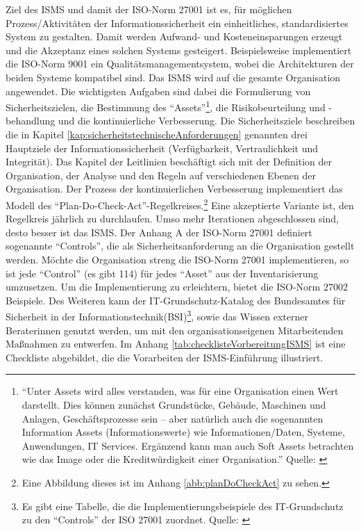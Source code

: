 Ziel des \ac{ISMS} und damit der ISO-Norm 27001 ist es, für möglichen Prozess/Aktivitäten der Informationssicherheit ein einheitliches, standardisiertes System zu gestalten. Damit werden Aufwand- und Kosteneinsparungen erzeugt und die Akzeptanz eines solchen Systems gesteigert. Beispielsweise implementiert die ISO-Norm 9001 ein Qualitätsmanagementsystem\autocite{dindeutsches_institut_fur_normung_qualitatsmanagementsysteme_2020}, wobei die Architekturen der beiden Systeme kompatibel sind. Das \ac{ISMS} wird auf die gesamte Organisation angewendet. Die wichtigsten Aufgaben sind dabei die Formulierung von Sicherheitszielen, die Bestimmung des \enquote{Assets}\footnote{\enquote{Unter Assets wird alles verstanden, was für eine Organisation einen Wert darstellt. Dies können zunächst Grundstücke, Gebäude, Maschinen und Anlagen, Geschäftsprozesse sein – aber natürlich auch die sogenannten Information Assets (Informationswerte) wie Informationen/Daten, Systeme, Anwendungen, IT Services. Ergänzend kann man auch Soft Assets betrachten wie das Image oder die Kreditwürdigkeit einer Organisation.} Quelle: \cite[][S.\,8]{kersten_it-sicherheitsmanagement_2020}}, die Risikobeurteilung und -behandlung und die kontinuierliche Verbesserung. Die Sicherheitsziele beschreiben die in Kapitel \vref{kap:sicherheitstechnischeAnforderungen} genannten drei Hauptziele der Informationssicherheit (Verfügbarkeit, Vertraulichkeit und Integrität). Das Kapitel der Leitlinien beschäftigt sich mit der Definition der Organisation, der Analyse und den Regeln auf verschiedenen Ebenen der Organisation. Der Prozess der kontinuierlichen Verbesserung implementiert das Modell des \enquote{Plan-Do-Check-Act}-Regelkreises.\footnote{Eine Abbildung dieses ist im Anhang \vref{abb:planDoCheckAct} zu sehen.} Eine akzeptierte Variante ist, den Regelkreis jährlich zu durchlaufen. Umso mehr Iterationen abgeschlossen sind, desto besser ist das \ac{ISMS}.\autocite[vgl.][S.\,16]{dindeutsches_institut_fur_normung_informationstechnik_2020} Der Anhang A der ISO-Norm 27001 definiert sogenannte \enquote{Controls}, die als Sicherheitsanforderung an die Organisation gestellt werden. Möchte die Organisation streng die ISO-Norm 27001 implementieren, so ist jede \enquote{Control} (es gibt 114) für jedes \enquote{Asset} aus der Inventarisierung umzusetzen. Um die Implementierung zu erleichtern, bietet die ISO-Norm 27002\autocite[vgl.][]{deutsches_institut_fur_normung_ev_informationstechnik_2017} Beispiele. Des Weiteren kann der IT-Grundschutz-Katalog des Bundesamtes für Sicherheit in der Informationstechnik(\acs{BSI})\footnote{Es gibt eine Tabelle, die die Implementierungsbeispiele des IT-Grundschutz zu den  \enquote{Controls} der ISO 27001 zuordnet. Quelle: \cite[][]{bundesamt_fur_sicherheit_in_der_informationstechnik_bsi_zuordnungstabelle_2018}}, sowie das Wissen externer Beraterinnen genutzt werden, um mit den organisationseigenen Mitarbeitenden Maßnahmen zu entwerfen. Im Anhang \vref{tab:checklisteVorbereitungISMS} ist eine Checkliste abgebildet, die die Vorarbeiten der \ac{ISMS}-Einführung illustriert.
 
